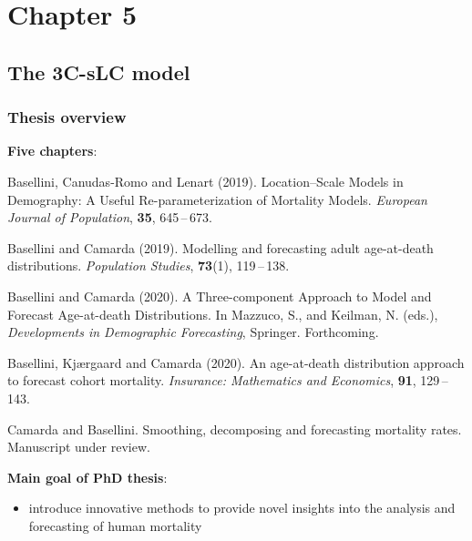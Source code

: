 \documentclass[12pt, xcolor=table]{beamer}  %
\begin{document}
\section{Chapter 5}
\subsection{The 3C-sLC model}
\begin{frame}[plain]\frametitle{Thesis overview}
	\textbf{Five chapters}: 
	\begin{itemize}
		\scriptsize	
		\item { Basellini, Canudas-Romo and Lenart (2019). Location--Scale Models in Demography: A Useful Re-parameterization of Mortality Models. {\it European Journal of Population}, {\bf 35}, 645\,--\,673. 	
			
		\item  Basellini and Camarda (2019). Modelling and forecasting adult age-at-death distributions. {\it Population Studies}, {\bf 73}(1), 119\,--\,138. 
			
		\item  Basellini and Camarda (2020). A Three-component Approach to Model and Forecast Age-at-death Distributions. In Mazzuco, S., and Keilman, N. (eds.), {\it Developments in Demographic Forecasting}, Springer. Forthcoming. 
		
		\item Basellini, Kj{\ae}rgaard and Camarda (2020). An age-at-death distribution approach \\ to forecast cohort mortality. {\it Insurance: Mathematics and Economics}, {\bf 91}, 129\,--\,143. }	
		
		\item {  Camarda and Basellini. Smoothing, decomposing and forecasting mortality rates. Manuscript under review. }	
	\end{itemize}
	\bigskip
	{\pgfsetfillopacity{1} 
		\textbf{Main goal of PhD thesis}: 
		\begin{itemize}
			\item introduce innovative methods to provide novel insights into the analysis and forecasting of human mortality	
		\end{itemize}
	}
\end{frame}
\end{document}
